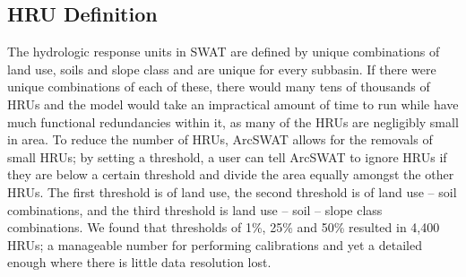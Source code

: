 \subsection{HRU Definition}\label{sec:hru_definition}

The hydrologic response units in SWAT are defined by unique combinations of land use, soils and slope class and are unique for every subbasin. If there were unique combinations of each of these, there would many tens of thousands of HRUs and the model would take an impractical amount of time to run while have much functional redundancies within it, as many of the HRUs are negligibly small in area. To reduce the number of HRUs, ArcSWAT allows for the removals of small HRUs; by setting a threshold, a user can tell ArcSWAT to ignore HRUs if they are below a certain threshold and divide the area equally amongst the other HRUs. The first threshold is of land use, the second threshold is of land use -- soil combinations, and the third threshold is land use -- soil -- slope class combinations. We found that thresholds of 1\%, 25\% and 50\% resulted in 4,400 HRUs; a manageable number for performing calibrations and yet a detailed enough where there is little data resolution lost.